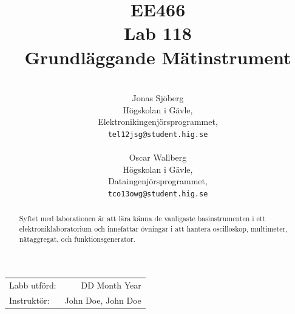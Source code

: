 \documentclass[11pt,a4paper]{article}
\title{EE466 \\ Lab 118 \\ Grundläggande Mätinstrument}
\author{\\
  Jonas Sjöberg\\
  Högskolan i Gävle,\\
  Elektronikingenjörsprogrammet,\\
  \texttt{tel12jsg@student.hig.se}\\
  \\
  Oscar Wallberg\\
  Högskolan i Gävle,\\
  Dataingenjörsprogrammet,\\
  \texttt{tco13owg@student.hig.se}\\}
\date{}
\begin{document}
\maketitle

\begin{center}
\begin{tabular}{l r}
    Labb utförd: & DD Month Year \\
    Instruktör: & John Doe, John Doe
\end{tabular}
\end{center}

\begin{abstract}
    Syftet med laborationen är att lära känna de vanligaste basinstrumenten i
    ett elektroniklaboratorium och innefattar övningar i att hantera
    oscilloskop, multimeter, nätaggregat, och funktionsgenerator.
\end{abstract}

\newpage

{
    \setcounter{tocdepth}{3}
    \tableofcontents
}

\newpage

\end{document}
